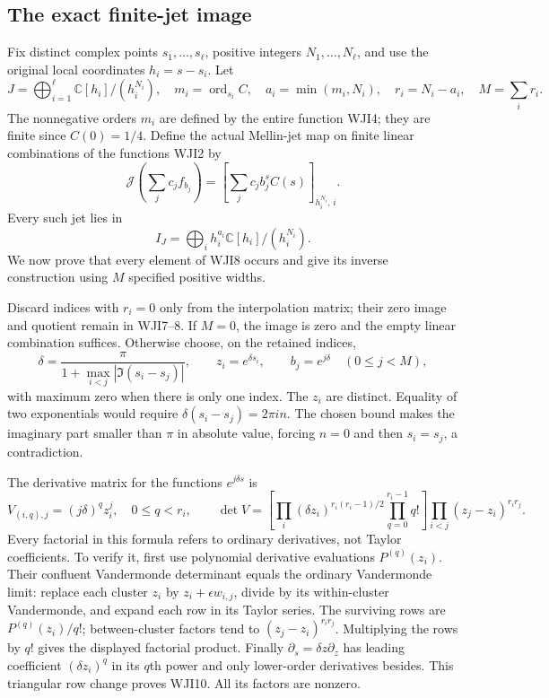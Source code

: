 \subsection{The exact finite-jet image}

Fix distinct complex points $s_1,\ldots,s_\ell$, positive integers
$N_1,\ldots,N_\ell$, and use the original local coordinates
$h_i=s-s_i$. Let
\begin{equation}\tag{WJI7}
 J=\bigoplus_{i=1}^{\ell}\mathbb C[h_i]/(h_i^{N_i}),
 \quad m_i=\operatorname{ord}_{s_i}C,\quad
 a_i=\min(m_i,N_i),\quad r_i=N_i-a_i,\quad M=\sum_i r_i.
\end{equation}
The nonnegative orders $m_i$ are defined by the entire function
WJI4; they are finite since $C(0)=1/4$. Define the actual
Mellin-jet map on finite linear combinations of the functions
WJI2 by
\[
 \mathcal J\!\left(\sum_j c_j f_{b_j}\right)
   =\left[\sum_j c_j b_j^s C(s)\right]_{h_i^{N_i},\,i}.
\]
Every such jet lies in
\begin{equation}\tag{WJI8}
 I_J=\bigoplus_i h_i^{a_i}\mathbb C[h_i]/(h_i^{N_i}).
\end{equation}
We now prove that every element of WJI8 occurs and give its
inverse construction using $M$ specified positive widths.

Discard indices with $r_i=0$ only from the interpolation matrix;
their zero image and quotient remain in WJI7--8. If $M=0$,
the image is zero and the empty linear combination suffices.
Otherwise choose, on the retained indices,
\begin{equation}\tag{WJI9}
 \delta=\frac{\pi}{1+\max_{i<j}|\Im(s_i-s_j)|},
 \qquad z_i=e^{\delta s_i},\qquad b_j=e^{j\delta}
       \quad(0\le j<M),
\end{equation}
with maximum zero when there is only one index.
The $z_i$ are distinct. Equality of two exponentials would
require $\delta(s_i-s_j)=2\pi i n$. The chosen bound makes
the imaginary part smaller than $\pi$ in absolute value,
forcing $n=0$ and then $s_i=s_j$, a contradiction.

The derivative matrix for the functions $e^{j\delta s}$ is
\begin{equation}\tag{WJI10}
 V_{(i,q),j}=(j\delta)^q z_i^j,\quad 0\le q<r_i,\qquad
 \det V=
 \left[\prod_i(\delta z_i)^{r_i(r_i-1)/2}
                   \prod_{q=0}^{r_i-1}q!\right]
 \prod_{i<j}(z_j-z_i)^{r_i r_j}.
\end{equation}
Every factorial in this formula refers to ordinary derivatives,
not Taylor coefficients. To verify it, first use polynomial
derivative evaluations $P^{(q)}(z_i)$. Their confluent
Vandermonde determinant equals the ordinary Vandermonde limit:
replace each cluster $z_i$ by $z_i+\epsilon w_{i,j}$,
divide by its within-cluster Vandermonde, and expand each row
in its Taylor series. The surviving rows are
$P^{(q)}(z_i)/q!$; between-cluster factors tend to
$(z_j-z_i)^{r_i r_j}$. Multiplying the rows by $q!$ gives
the displayed factorial product. Finally
$\partial_s=\delta z\partial_z$ has leading coefficient
$(\delta z_i)^q$ in its $q$th power and only lower-order
derivatives besides. This triangular row change proves WJI10.
All its factors are nonzero.

